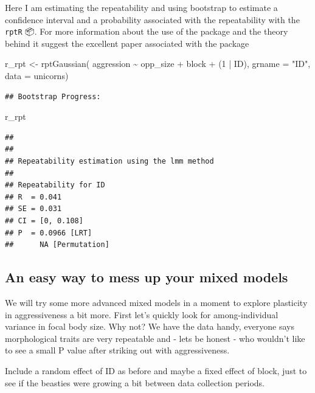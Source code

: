 \documentclass[
  12pt,
]{book}
\newenvironment{Shaded}{\begin{snugshade}}{\end{snugshade}}
\newcommand{\AttributeTok}[1]{\textcolor[rgb]{0.77,0.63,0.00}{#1}}
\newcommand{\DecValTok}[1]{\textcolor[rgb]{0.00,0.00,0.81}{#1}}
\newcommand{\FunctionTok}[1]{\textcolor[rgb]{0.00,0.00,0.00}{#1}}
\newcommand{\NormalTok}[1]{#1}
\newcommand{\OtherTok}[1]{\textcolor[rgb]{0.56,0.35,0.01}{#1}}
\newcommand{\SpecialCharTok}[1]{\textcolor[rgb]{0.00,0.00,0.00}{#1}}
\newcommand{\StringTok}[1]{\textcolor[rgb]{0.31,0.60,0.02}{#1}}
\begin{document}
Here I am estimating the repeatability and using bootstrap to estimate a confidence interval and a probability associated with the repeatability with the \texttt{rptR} 📦. For more information about the use of the package and the theory behind it suggest the excellent paper associated with the package \citep{rptR2017}

\begin{Shaded}
\begin{Highlighting}[]
\NormalTok{r\_rpt }\OtherTok{\textless{}{-}} \FunctionTok{rptGaussian}\NormalTok{(}
\NormalTok{  aggression }\SpecialCharTok{\textasciitilde{}}\NormalTok{ opp\_size }\SpecialCharTok{+}\NormalTok{ block }\SpecialCharTok{+}\NormalTok{ (}\DecValTok{1} \SpecialCharTok{|}\NormalTok{ ID),}
  \AttributeTok{grname =} \StringTok{"ID"}\NormalTok{, }\AttributeTok{data =}\NormalTok{ unicorns)}
\end{Highlighting}
\end{Shaded}

\begin{verbatim}
## Bootstrap Progress:
\end{verbatim}

\begin{Shaded}
\begin{Highlighting}[]
\NormalTok{r\_rpt}
\end{Highlighting}
\end{Shaded}

\begin{verbatim}
## 
## 
## Repeatability estimation using the lmm method 
## 
## Repeatability for ID
## R  = 0.041
## SE = 0.031
## CI = [0, 0.108]
## P  = 0.0966 [LRT]
##      NA [Permutation]
\end{verbatim}

\hypertarget{an-easy-way-to-mess-up-your-mixed-models}{%
\subsection{An easy way to mess up your mixed models}\label{an-easy-way-to-mess-up-your-mixed-models}}

We will try some more advanced mixed models in a moment to explore plasticity in aggressiveness a bit more. First let's quickly look for among-individual variance in focal body size. Why not? We have the data handy, everyone says morphological traits are very repeatable and - lets be honest - who wouldn't like to see a small P value after striking out with aggressiveness.

Include a random effect of ID as before and maybe a fixed effect of block, just to see if the beasties were growing a bit between data collection periods.
\end{document}
